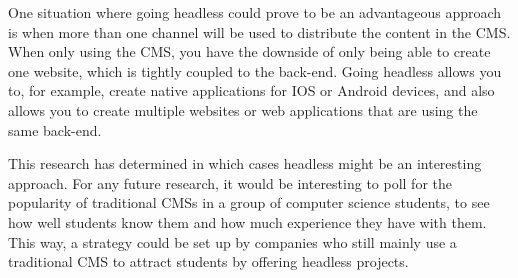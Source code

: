 One situation where going headless could prove to be an advantageous approach is when more than one channel will be used to distribute the content in the CMS. When only using the CMS, you have the downside of only being able to create one website, which is tightly coupled to the back-end. Going headless allows you to, for example, create native applications for IOS or Android devices, and also allows you to create multiple websites or web applications that are using the same back-end.

This research has determined in which cases headless might be an interesting approach. For any future research, it would be interesting to poll for the popularity of traditional CMSs in a group of computer science students, to see how well students know them and how much experience they have with them. This way, a strategy could be set up by companies who still mainly use a traditional CMS to attract students by offering headless projects.
